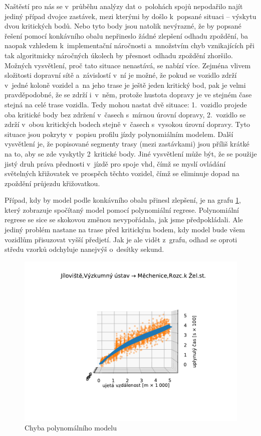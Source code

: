 \bigbreak

Naštěstí pro nás se v~průběhu analýzy dat o~polohách spojů nepodařilo najít jediný případ dvojce zastávek, mezi kterými by došlo k~popsané situaci -- výskytu dvou kritických bodů. Nebo tyto body jsou natolik nevýrazné, že by popsané řešení pomocí konkávního obalu nepřineslo žádné zlepšení odhadu zpoždění, ba naopak vzhledem k~implementační náročnosti a~množstvím chyb vznikajících při tak algoritmicky náročných úkolech by přesnost odhadu zpoždění zhoršilo. Možných vysvětlení, proč tato situace nenastává, se nabízí více. Zejména vlivem složitosti dopravní sítě a~závislostí v~ní je možné, že pokud se vozidlo zdrží v~jedné koloně vozidel a~na jeho trase je ještě jeden kritický bod, pak je velmi pravděpodobné, že se zdrží i~v~něm, protože hustota dopravy je ve stejném čase stejná na celé trase vozidla. Tedy mohou nastat dvě situace: 1.~vozidlo projede oba kritické body bez zdržení v~časech s~mírnou úrovní dopravy, 2.~vozidlo se zdrží v~obou kritických bodech stejně v~časech s~vysokou úrovní dopravy. Tyto situace jsou pokryty v~popisu profilu jízdy polynomiálním modelem. Další vysvětlení je, že popisované segmenty trasy (mezi zastávkami) jsou příliš krátké na to, aby se zde vyskytly 2~kritické body. Jiné vysvětlení může být, že se použije jistý druh práva přednosti v~jízdě pro spoje \gls{vhd}, čímž se myslí ovládání světelných křižovatek ve prospěch těchto vozidel, čímž se eliminuje dopad na zpoždění průjezdu křižovatkou.


\bigbreak

Případ, kdy by model podle konkávního obalu přinesl zlepšení, je na grafu \ref{fig:good_to_concave_hull}, který zobrazuje spočítaný model pomocí polynomiální regrese. Polynomiální regrese se sice se skokovou změnou nevypořádala, jak jsme předpokládali. Ale jediný problém nastane na trase před kritickým bodem, kdy model bude všem vozidlům přisuzovat vyšší předjetí. Jak je ale vidět z~grafu, odhad se oproti středu vzorků odchyluje nanejvýš o~desítky sekund.


\begin{figure}
\centering
  \includegraphics[width=\linewidth]{../img/8_9}
  \caption{Chyba polynomálního modelu}
  \label{fig:good_to_concave_hull}
\end{figure}


